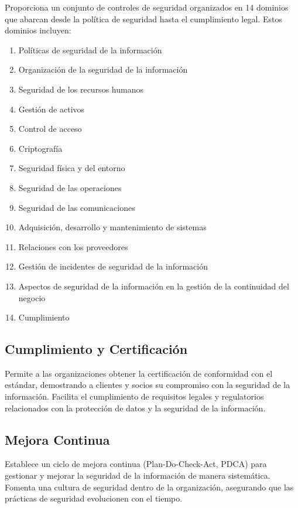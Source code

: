 \documentclass[12pt,a4paper]{article}
\begin{document}
Proporciona un conjunto de controles de seguridad organizados en 14 dominios que abarcan desde la política de seguridad hasta el cumplimiento legal.
Estos dominios incluyen:
\begin{enumerate}
    \item Políticas de seguridad de la información
    \item Organización de la seguridad de la información
    \item Seguridad de los recursos humanos
    \item Gestión de activos
    \item Control de acceso
    \item Criptografía
    \item Seguridad física y del entorno
    \item Seguridad de las operaciones
    \item Seguridad de las comunicaciones
    \item Adquisición, desarrollo y mantenimiento de sistemas
    \item Relaciones con los proveedores
    \item Gestión de incidentes de seguridad de la información
    \item Aspectos de seguridad de la información en la gestión de la continuidad del negocio
    \item Cumplimiento
    
\end{enumerate}
\subsection*{Cumplimiento y Certificación}

Permite a las organizaciones obtener la certificación de conformidad con el estándar, demostrando a clientes y socios su compromiso con la seguridad de la información.
Facilita el cumplimiento de requisitos legales y regulatorios relacionados con la protección de datos y la seguridad de la información.
\subsection*{Mejora Continua}

Establece un ciclo de mejora continua (Plan-Do-Check-Act, PDCA) para gestionar y mejorar la seguridad de la información de manera sistemática.
Fomenta una cultura de seguridad dentro de la organización, asegurando que las prácticas de seguridad evolucionen con el tiempo.
\end{document}
